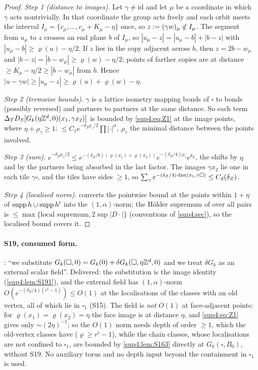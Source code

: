 \begin{proof}
\emph{Step 1 (distance to images).} Let $\gamma\ne\mathrm{id}$ and let $\mu$ be a coordinate in which $\gamma$ acts nontrivially. In that coordinate the group acts freely and each orbit meets the interval $I_\mu=\{c_\mu,\dots,c_\mu+K_\mu-\eta\}$ once, so $z:=(\gamma w)_\mu\notin I_\mu$. The segment from $u_\mu$ to $z$ crosses an end plane $b$ of $I_\mu$, so $|u_\mu-z|=|u_\mu-b|+|b-z|$ with $|u_\mu-b|\ge\varrho(u)-\eta/2$. If $z$ lies in the copy adjacent across $b$, then $z=2b-w_\mu$ and $|b-z|=|b-w_\mu|\ge\varrho(w)-\eta/2$; points of farther copies are at distance $\ge K_\mu-\eta/2\ge|b-w_\mu|$ from $b$. Hence $|u-\gamma w|\ge|u_\mu-z|\ge\varrho(u)+\varrho(w)-\eta$.

\emph{Step 2 (termwise bounds).} $\gamma$ is a lattice isometry mapping bonds of $\square$ to bonds (possibly reversed) and partners to partners at the same distance. So each term $\Delta_TD_S[G_k(\eta\mathbb Z^d,0)(x_1,\gamma x_2)]$ is bounded by \eqref{sup4:eq:Z1} at the image points, where $\eta+\rho_\gamma\ge1$: $\le C_1e^{-\delta_Z\rho_\gamma/2}\prod|\cdot|^\alpha$, $\rho_\gamma$ the minimal distance between the points involved.

\emph{Step 3 (sum).} $e^{-\delta_Z\rho_\gamma/2}\le e^{-(\delta_Z/8)(\varrho(x_1)+\varrho(x_2))}e^{-(\delta_Z/4)\rho_\gamma}e^{\delta_Z}$, the shifts by $\eta$ and by the partners being absorbed in the last factor. The images $\gamma x_2$ lie one in each tile $\gamma\square$, and the tiles have sides $\ge1$, so $\sum_{\gamma}e^{-(\delta_Z/4)\operatorname{dist}(x_1,\gamma\square)}\le C_d(\delta_Z)$.

\emph{Step 4 (localised norm).}  converts the pointwise bound at the points within $1+\eta$ of $\operatorname{supp} h\cup\operatorname{supp} h'$ into the $(1,\alpha)$-norm; the H\"older supremum of \cite[(1.32)]{Ba3} over all pairs is $\le\max\{\text{local supremum},2\sup|D\cdot|\}$ (conventions of \cref{sup4:sec}), so the localised bound covers it.
\end{proof}

\paragraph{S19, consumed form.} \cite[p.~433]{Ba3}: ``we substitute $G_k(\square,0)=G_k(0)+\delta G_k(\square,\eta\mathbb Z^d,0)$ and we treat $\delta G_k$ as an external scalar field''. Delivered: the substitution is the image identity (\cref{sup4:lem:S191}), and the external field has $(1,\alpha)$-norm $O(e^{-(\delta_Z/4)(r^\flat-1)})\le O(1)$ at the localisations of the classes with an old vertex, all of which lie in $\square_1$ (S15). The field is \emph{not} $O(1)$ at face-adjacent points: for $\varrho(x_1)=\varrho(x_2)=\eta$ the face image is at distance $\eta$, and \eqref{sup4:eq:Z1} gives only $\sim(2\eta)^{-1}$; so the $O(1)$ norm needs depth of order $\ge1$, which the old-vertex classes have ($\varrho\ge r^\flat-1$), while the chain classes, whose localisations are not confined to $\square_1$, are bounded by \cref{sup4:lem:S163} directly at $G_k(\square,B_0)$, without S19. No auxiliary torus and no depth input beyond the containment in $\square_1$ is used.
